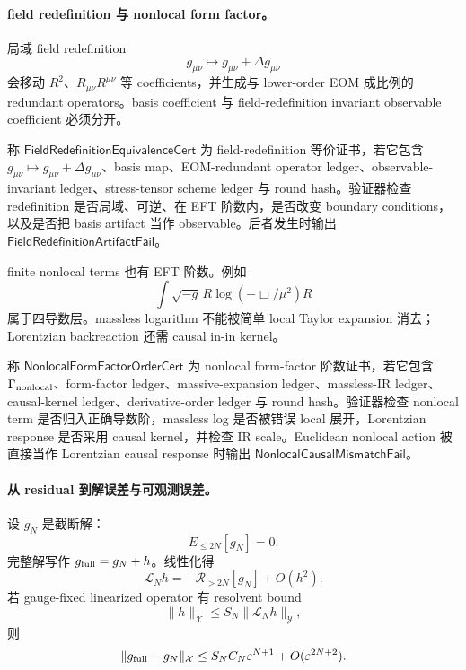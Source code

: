 \paragraph{field redefinition 与 nonlocal form factor。}
局域 field redefinition
\[
g_{\mu\nu}\mapsto g_{\mu\nu}+\Delta g_{\mu\nu}
\]
会移动 \(R^2\)、\(R_{\mu\nu}R^{\mu\nu}\) 等 coefficients，并生成与 lower-order EOM 成比例的 redundant operators。basis coefficient 与 field-redefinition invariant observable coefficient 必须分开。

\begin{definition}\label{def:typed-address-biaxial-completion-field-redefinition-equivalence-cert}
称 \(\mathsf{FieldRedefinitionEquivalenceCert}\) 为 field-redefinition 等价证书，若它包含 \(g_{\mu\nu}\mapsto g_{\mu\nu}+\Delta g_{\mu\nu}\)、basis map、EOM-redundant operator ledger、observable-invariant ledger、stress-tensor scheme ledger 与 round hash。验证器检查 redefinition 是否局域、可逆、在 EFT 阶数内，是否改变 boundary conditions，以及是否把 basis artifact 当作 observable。后者发生时输出 \(\mathsf{FieldRedefinitionArtifactFail}\)。
\end{definition}

finite nonlocal terms 也有 EFT 阶数。例如
\[
\int\sqrt{-g}\,R\log(-\Box/\mu^2)R
\]
属于四导数层。massless logarithm 不能被简单 local Taylor expansion 消去；Lorentzian backreaction 还需 causal in-in kernel。

\begin{definition}\label{def:typed-address-biaxial-completion-nonlocal-form-factor-order-cert}
称 \(\mathsf{NonlocalFormFactorOrderCert}\) 为 nonlocal form-factor 阶数证书，若它包含 \(\Gamma_{\rm nonlocal}\)、form-factor ledger、massive-expansion ledger、massless-IR ledger、causal-kernel ledger、derivative-order ledger 与 round hash。验证器检查 nonlocal term 是否归入正确导数阶，massless log 是否被错误 local 展开，Lorentzian response 是否采用 causal kernel，并检查 IR scale。Euclidean nonlocal action 被直接当作 Lorentzian causal response 时输出 \(\mathsf{NonlocalCausalMismatchFail}\)。
\end{definition}

\paragraph{从 residual 到解误差与可观测误差。}
设 \(g_N\) 是截断解：
\[
E_{\le2N}[g_N]=0.
\]
完整解写作 \(g_{\rm full}=g_N+h\)。线性化得
\[
\mathcal L_Nh=-\mathcal R_{>2N}[g_N]+O(h^2).
\]
若 gauge-fixed linearized operator 有 resolvent bound
\[
\|h\|_{\mathcal X}
\le
S_N\|\mathcal L_Nh\|_{\mathcal Y},
\]
则
\[
\|g_{\rm full}-g_N\|_{\mathcal X}
\le
S_NC_N\varepsilon^{N+1}+O(\varepsilon^{2N+2}).
\]

